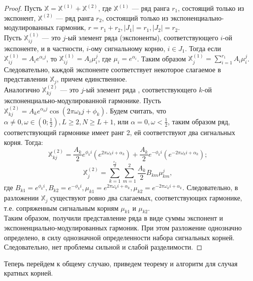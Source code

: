 \documentclass[specialist, substylefile = spbureport.rtx, subf,href,colorlinks=true, 12pt]{disser}
\theoremstyle{definition}
\begin{document}
\begin{proof}
Пусть $\mathbb{X} = \mathbb{X}^{(1)} + \mathbb{X}^{(2)}$, где $\mathbb{X}^{(1)}$ --- ряд ранга $r_1$, состоящий только из экспонент, $\mathbb{X}^{(2)}$ --- ряд ранга $r_2$, состоящий только из экспоненциально-модулированных гармоник, $r = r_1 + r_2, |J_1| = r_1, |J_2| = r_2$. \\
\hspace*{0.5cm}Пусть $\mathbb{X}^{(1)}_{ij}$ --- это $j$-ый элемент ряда (экспоненты), соответствующего $i$-ой экспоненте, и в частности, $i$-ому сигнальному корню, $i \in J_1$. Тогда если $\mathbb{X}^{(1)}_{ij} = A_i e^{\alpha_i j}$, то $\mathbb{X}^{(1)}_{ij} = A_i\mu_i^j$, где $\mu_i = e^{\alpha_i}$. Таким образом $\mathbb{X}^{(1)}_j = \sum_{i = 1}^{r_1}A_i\mu_i^j$. Следовательно, каждой экспоненте соответствует некоторое слагаемое в представлении $\mathbb{X}_j$, причем единственное. \\
\hspace*{0.5cm} Аналогично $\mathbb{X}^{(2)}_{kj}$ --- это $j$-ый элемент ряда , соответствующего $k$-ой экспоненциально-модулированной гармонике. Пусть $\mathbb{X}^{(2)}_{kj} = A_k e^{\alpha_k j}\cos (2\pi \omega_k j + \phi_k)$. Будем считать, что $\alpha \neq 0,\omega \in (0;\frac{1}{2}), L \geq 2, N \geq L + 1$, или $\alpha = 0, \omega < \frac{1}{2}$, таким образом ряд, соответствующий гармонике имеет ранг 2, ей соответствуют два сигнальных корня. Тогда:
\begin{equation*}
    \mathbb{X}^{(2)}_{kj} = \frac{A_k}{2}e^{\phi_k i}(e^{2\pi \omega_k i + \alpha_k}) + \frac{A_k}{2}e^{-\phi_k i}(e^{-2\pi \omega_k i + \alpha_k});
\end{equation*}
\begin{equation*}
    \mathbb{X}^{(2)}_{j} = \sum_{k = 1}^{\frac{r_2}{2}}\sum_{m = 1}^{2}\frac{A_k}{2}B_{km}\mu_{km}^{j},
\end{equation*}
где $B_{k1} = e^{\phi_k i}, B_{k2} = e^{-\phi_k i}, \mu_{k1} = e^{2\pi \omega_k i + \alpha_k}, \mu_{k2} = e^{-2\pi \omega_k i + \alpha_k}$. Следовательно, в разложении $\mathbb{X}_j$ существуют ровно два слагаемых, соответствующих гармонике, т.е. сопряженным сигнальным корням $\mu_{k1}$ и $\mu_{k2}$. \\
Таким образом, получили представление ряда в виде суммы экспонент и экспоненциально-модулированных гармоник. При этом разложение однозначно определено, в силу однозначной определенности набора сигнальных корней. Следовательно, нет проблемы сильной и слабой разделимости.
\end{proof}

Теперь перейдем к общему случаю, приведем теорему и алгоритм для случая кратных корней.
\end{document}
